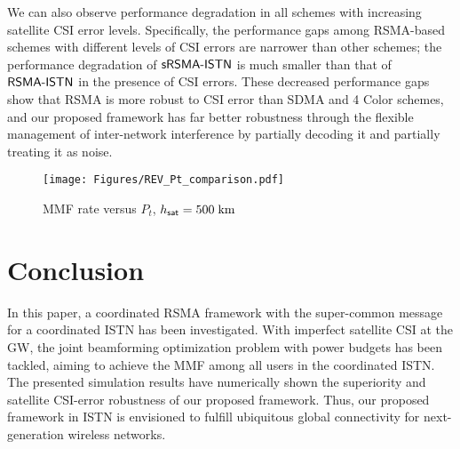 \documentclass[draftclsnofoot, onecolumn, comsoc, 12pt]{IEEEtran}
\begin{document}
We can also observe performance degradation in all schemes with increasing satellite CSI error levels. 
Specifically, the performance gaps among RSMA-based schemes with different levels of CSI errors are narrower than other schemes; the performance degradation of $\sf{sRSMA\mbox{-}ISTN}$ is much smaller than that of $\sf{RSMA\mbox{-}ISTN}$ in the presence of CSI errors. 
{These decreased performance gaps show that RSMA is more robust to CSI error than SDMA and 4 Color schemes, and our proposed framework has far better robustness through the flexible management of inter-network interference by partially decoding it and partially treating it as noise.}
\begin{figure}
    \centering   
      \vspace{-80mm}   
  \texttt{[image: Figures/REV\_Pt\_comparison.pdf]}
    \vspace{-80mm}
    \caption{MMF rate versus $P_{t}$, $h_{\sf{sat}} = 500\;\mathrm{km}$} 
\label{fig:ImperfectCSI}
\end{figure}
\section{Conclusion} 
In this paper, a coordinated RSMA framework with the super-common message for a coordinated ISTN  has been investigated. 
With imperfect satellite CSI at the GW, the joint beamforming optimization problem with power budgets has been tackled, aiming to achieve the MMF among all users in the coordinated ISTN.
The presented simulation results have numerically shown the superiority and satellite CSI-error robustness of our proposed framework. 
Thus, our proposed framework in ISTN is envisioned to fulfill ubiquitous global connectivity for  next-generation wireless networks.





\end{document}
